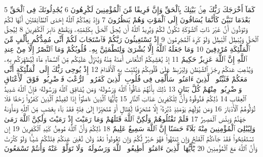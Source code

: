 {\tiny\colorbox{cl_aya}{5}} كَمَآ أَخْرَجَكَ رَبُّكَ مِنۢ بَيْتِكَ بِٱلْحَقِّ وَإِنَّ فَرِيقًا مِّنَ ٱلْمُؤْمِنِينَ لَكَٰرِهُونَ
{\tiny\colorbox{cl_aya}{6}} يُجَٰدِلُونَكَ فِى ٱلْحَقِّ بَعْدَمَا تَبَيَّنَ كَأَنَّمَا يُسَاقُونَ إِلَى ٱلْمَوْتِ وَهُمْ يَنظُرُونَ
{\tiny\colorbox{cl_aya}{7}} وَإِذْ يَعِدُكُمُ ٱللَّهُ إِحْدَى ٱلطَّآئِفَتَيْنِ أَنَّهَا لَكُمْ وَتَوَدُّونَ أَنَّ غَيْرَ ذَاتِ ٱلشَّوْكَةِ تَكُونُ لَكُمْ وَيُرِيدُ ٱللَّهُ أَن يُحِقَّ ٱلْحَقَّ بِكَلِمَٰتِهِۦ وَيَقْطَعَ دَابِرَ ٱلْكَٰفِرِينَ
{\tiny\colorbox{cl_aya}{8}} لِيُحِقَّ ٱلْحَقَّ وَيُبْطِلَ ٱلْبَٰطِلَ وَلَوْ كَرِهَ ٱلْمُجْرِمُونَ
{\tiny\colorbox{cl_aya}{9}} إِذْ تَسْتَغِيثُونَ رَبَّكُمْ فَٱسْتَجَابَ لَكُمْ أَنِّى مُمِدُّكُم بِأَلْفٍ مِّنَ ٱلْمَلَٰٓئِكَةِ مُرْدِفِينَ
{\tiny\colorbox{cl_aya}{10}} وَمَا جَعَلَهُ ٱللَّهُ إِلَّا بُشْرَىٰ وَلِتَطْمَئِنَّ بِهِۦ قُلُوبُكُمْ وَمَا ٱلنَّصْرُ إِلَّا مِنْ عِندِ ٱللَّهِ إِنَّ ٱللَّهَ عَزِيزٌ حَكِيمٌ
{\tiny\colorbox{cl_aya}{11}} إِذْ يُغَشِّيكُمُ ٱلنُّعَاسَ أَمَنَةً مِّنْهُ وَيُنَزِّلُ عَلَيْكُم مِّنَ ٱلسَّمَآءِ مَآءً لِّيُطَهِّرَكُم بِهِۦ وَيُذْهِبَ عَنكُمْ رِجْزَ ٱلشَّيْطَٰنِ وَلِيَرْبِطَ عَلَىٰ قُلُوبِكُمْ وَيُثَبِّتَ بِهِ ٱلْأَقْدَامَ
{\tiny\colorbox{cl_aya}{12}} إِذْ يُوحِى رَبُّكَ إِلَى ٱلْمَلَٰٓئِكَةِ أَنِّى مَعَكُمْ فَثَبِّتُوا۟ ٱلَّذِينَ ءَامَنُوا۟ سَأُلْقِى فِى قُلُوبِ ٱلَّذِينَ كَفَرُوا۟ ٱلرُّعْبَ فَٱضْرِبُوا۟ فَوْقَ ٱلْأَعْنَاقِ وَٱضْرِبُوا۟ مِنْهُمْ كُلَّ بَنَانٍ
{\tiny\colorbox{cl_aya}{13}} ذَٰلِكَ بِأَنَّهُمْ شَآقُّوا۟ ٱللَّهَ وَرَسُولَهُۥ وَمَن يُشَاقِقِ ٱللَّهَ وَرَسُولَهُۥ فَإِنَّ ٱللَّهَ شَدِيدُ ٱلْعِقَابِ
{\tiny\colorbox{cl_aya}{14}} ذَٰلِكُمْ فَذُوقُوهُ وَأَنَّ لِلْكَٰفِرِينَ عَذَابَ ٱلنَّارِ
{\tiny\colorbox{cl_aya}{15}} يَٰٓأَيُّهَا ٱلَّذِينَ ءَامَنُوٓا۟ إِذَا لَقِيتُمُ ٱلَّذِينَ كَفَرُوا۟ زَحْفًا فَلَا تُوَلُّوهُمُ ٱلْأَدْبَارَ
{\tiny\colorbox{cl_aya}{16}} وَمَن يُوَلِّهِمْ يَوْمَئِذٍ دُبُرَهُۥٓ إِلَّا مُتَحَرِّفًا لِّقِتَالٍ أَوْ مُتَحَيِّزًا إِلَىٰ فِئَةٍ فَقَدْ بَآءَ بِغَضَبٍ مِّنَ ٱللَّهِ وَمَأْوَىٰهُ جَهَنَّمُ وَبِئْسَ ٱلْمَصِيرُ
{\tiny\colorbox{cl_aya}{17}} فَلَمْ تَقْتُلُوهُمْ وَلَٰكِنَّ ٱللَّهَ قَتَلَهُمْ وَمَا رَمَيْتَ إِذْ رَمَيْتَ وَلَٰكِنَّ ٱللَّهَ رَمَىٰ وَلِيُبْلِىَ ٱلْمُؤْمِنِينَ مِنْهُ بَلَآءً حَسَنًا إِنَّ ٱللَّهَ سَمِيعٌ عَلِيمٌ
{\tiny\colorbox{cl_aya}{18}} ذَٰلِكُمْ وَأَنَّ ٱللَّهَ مُوهِنُ كَيْدِ ٱلْكَٰفِرِينَ
{\tiny\colorbox{cl_aya}{19}} إِن تَسْتَفْتِحُوا۟ فَقَدْ جَآءَكُمُ ٱلْفَتْحُ وَإِن تَنتَهُوا۟ فَهُوَ خَيْرٌ لَّكُمْ وَإِن تَعُودُوا۟ نَعُدْ وَلَن تُغْنِىَ عَنكُمْ فِئَتُكُمْ شَيْـًٔا وَلَوْ كَثُرَتْ وَأَنَّ ٱللَّهَ مَعَ ٱلْمُؤْمِنِينَ
{\tiny\colorbox{cl_aya}{20}} يَٰٓأَيُّهَا ٱلَّذِينَ ءَامَنُوٓا۟ أَطِيعُوا۟ ٱللَّهَ وَرَسُولَهُۥ وَلَا تَوَلَّوْا۟ عَنْهُ وَأَنتُمْ تَسْمَعُونَ
